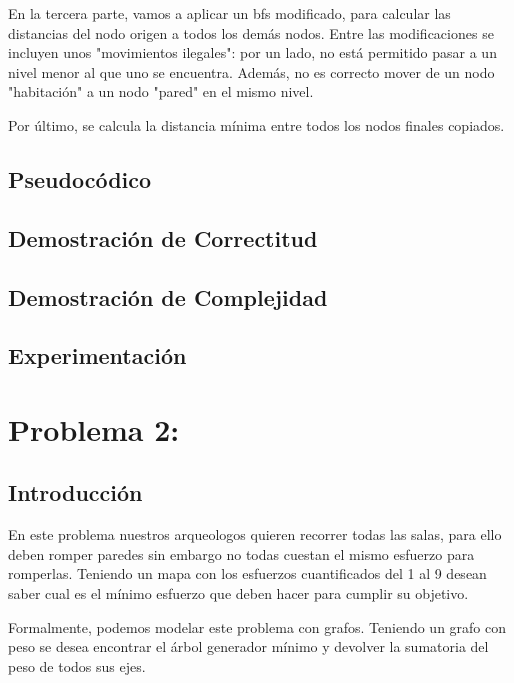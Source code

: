 \documentclass[spanish,12pt]{article}
\begin{document}

En la tercera parte, vamos a aplicar un bfs modificado, para calcular las distancias del nodo origen a todos los demás nodos. Entre las modificaciones se incluyen unos "movimientos ilegales": por un lado, no está permitido pasar a un nivel menor al que uno se encuentra. Además, no es correcto mover de un nodo "habitación" a un nodo "pared" en el mismo nivel.

Por último, se calcula la distancia mínima entre todos los nodos finales copiados.



\subsection{Pseudocódico}


\subsection{Demostración de Correctitud}



\subsection{Demostración de Complejidad}


\subsection{Experimentación}

\section{Problema 2: }

\subsection{Introducción}

En este problema nuestros arqueologos quieren recorrer todas las salas, para ello deben romper paredes sin embargo no todas cuestan el mismo esfuerzo para romperlas. Teniendo un mapa con los esfuerzos cuantificados del 1 al 9 desean saber cual es el mínimo esfuerzo que deben hacer para cumplir su objetivo.

Formalmente, podemos modelar este problema con grafos. Teniendo un grafo con peso se desea encontrar el árbol generador mínimo y devolver la sumatoria del peso de todos sus ejes.
\end{document}
